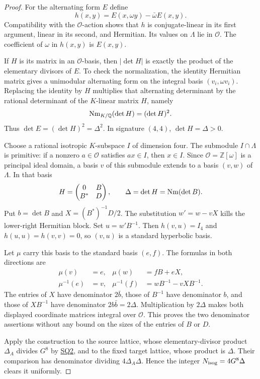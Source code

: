 \documentclass[11pt,a4paper]{article}
\theoremstyle{definition}\newtheorem{definition}[theorem]{Definition}
\theoremstyle{remark}\newtheorem{remark}[theorem]{Remark}
\newcommand{\Q}{\mathbb Q}\newcommand{\Z}{\mathbb Z}\newcommand{\C}{\mathbb C}\newcommand{\R}{\mathbb R}
\newcommand{\cO}{\mathcal O}\newcommand{\CH}{\operatorname{CH}}\newcommand{\cl}{\operatorname{cl}}
\newcommand{\findingref}[1]{\hyperref[#1]{\textsf{#1}}}
\begin{document}
\begin{proof}
For the alternating form $E$ define
\begin{equation}\label{eq:SQ-integralHermitian}
 h(x,y)=E(x,\omega y)-\bar\omega E(x,y).
\end{equation}
Compatibility with the $\cO$-action shows that $h$ is conjugate-linear in its first argument, linear in its second, and Hermitian. Its values on $\Lambda$ lie in $\cO$. The coefficient of $\omega$ in $h(x,y)$ is $E(x,y)$.

If $H$ is its matrix in an $\cO$-basis, then $|\det H|$ is exactly the product of the elementary divisors of $E$. To check the normalization, the identity Hermitian matrix gives a unimodular alternating form on the integral basis $(v_i,\omega v_i)$. Replacing the identity by $H$ multiplies that alternating determinant by the rational determinant of the $K$-linear matrix $H$, namely
\[
 \Nm_{K/\Q}(\det H)=(\det H)^2.
\]
Thus $\det E=(\det H)^2=\Delta^2$. In signature $(4,4)$, $\det H=\Delta>0$.

Choose a rational isotropic $K$-subspace $I$ of dimension four. The submodule $I\cap\Lambda$ is primitive: if a nonzero $a\in\cO$ satisfies $ax\in I$, then $x\in I$. Since $\cO=\Z[\omega]$ is a principal ideal domain, a basis $v$ of this submodule extends to a basis $(v,w)$ of $\Lambda$. In that basis
\[
 H=\begin{pmatrix}0&B\\B^*&D\end{pmatrix},
 \qquad \Delta=\det H=\operatorname{Nm}(\det B).
\]
Put $b=\det B$ and $X=(B^*)^{-1}D/2$. The substitution $w'=w-vX$ kills the lower-right Hermitian block. Set $u=w'B^{-1}$. Then $h(v,u)=I_4$ and $h(u,u)=h(v,v)=0$, so $(v,u)$ is a standard hyperbolic basis.

Let $\mu$ carry this basis to the standard basis $(e,f)$. The formulas in both directions are
\begin{align*}
 \mu(v)&=e,& \mu(w)&=fB+eX,\\
 \mu^{-1}(e)&=v,& \mu^{-1}(f)&=wB^{-1}-vXB^{-1}.
\end{align*}
The entries of $X$ have denominator $2\bar b$, those of $B^{-1}$ have denominator $b$, and those of $XB^{-1}$ have denominator $2b\bar b=2\Delta$. Multiplication by $2\Delta$ makes both displayed coordinate matrices integral over $\cO$. This proves the two denominator assertions without any bound on the sizes of the entries of $B$ or $D$.

Apply the construction to the source lattice, whose elementary-divisor product $\Delta_A$ divides $G^8$ by \findingref{SQ2}, and to the fixed target lattice, whose product is $\Delta$. Their comparison has denominator dividing $4\Delta_A\Delta$. Hence the integer $N_{\rm isog}=4G^8\Delta$ clears it uniformly.


\end{proof}
\end{document}
